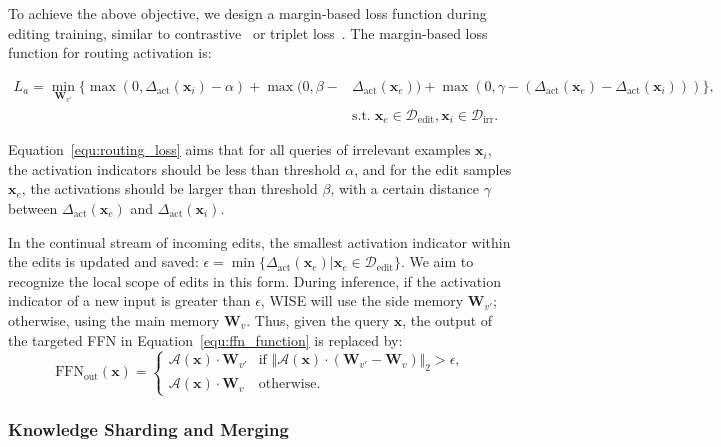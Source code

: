 \documentclass{article}
\begin{document}
To achieve the above objective, we design a margin-based loss function during editing training, similar to contrastive~\cite{simclr} or triplet loss~\cite{triple_loss}. The margin-based loss function for routing activation is:
\begin{small}
\begin{align}
    L_a = \min_{\mathbf{W}_{v'}} \{ \max(0, \Delta_{\text{act}}(\mathbf{x}_i) - \alpha) + \max(0, \beta -& \Delta_{\text{act}}(\mathbf{x}_e)) + \max(0, \gamma - (\Delta_{\text{act}}(\mathbf{x}_e) - \Delta_{\text{act}}(\mathbf{x}_i))) \},\label{equ:routing_loss}\\
    &\text{s.t.}\; \mathbf{x}_e \in \mathcal{D}_{\text{edit}}, \mathbf{x}_i \in \mathcal{D}_{\text{irr}}.\nonumber
\end{align}
\end{small}
Equation~\ref{equ:routing_loss} aims that for all queries of irrelevant examples $\mathbf{x}_i$, the activation indicators should be less than threshold $\alpha$, and for the edit samples $\mathbf{x}_e$, the activations should be larger than threshold $\beta$, with a certain distance $\gamma$ between $\Delta_{\text{act}}(\mathbf{x}_e)$ and $\Delta_{\text{act}}(\mathbf{x}_i)$.

In the continual stream of incoming edits, the smallest activation indicator within the edits is updated and saved:
$\epsilon = \min \{\Delta_{\text{act}}(\mathbf{x}_e)| \mathbf{x}_e \in \mathcal{D}_{\text{edit}}\}$.
We aim to recognize the local scope of edits in this form.
During inference, if the activation indicator of a new input is greater than $\epsilon$, WISE will use the side memory $\mathbf{W}_{v'}$; otherwise, using the main memory $\mathbf{W}_{v}$. 
Thus, given the query $\mathbf{x}$, the output of the targeted FFN in Equation~\ref{equ:ffn_function} is replaced by:
\begin{equation}\label{equ:ffn_out}
    \text{FFN}_\text{out}(\mathbf{x}) = \begin{cases}
    \mathcal{A}(\mathbf{x}) \cdot \mathbf{W}_{v'} &\mbox{if $\Vert \mathcal{A}(\mathbf{x}) \cdot (\mathbf{W}_{v'} - \mathbf{W}_v) \Vert_2 > \epsilon$,}\\
    \mathcal{A}(\mathbf{x}) \cdot \mathbf{W}_{v} &\mbox{otherwise.}
    \end{cases}
\end{equation}

\subsubsection{Knowledge Sharding and Merging} \label{subsec:knowledge_merging}
\end{document}
